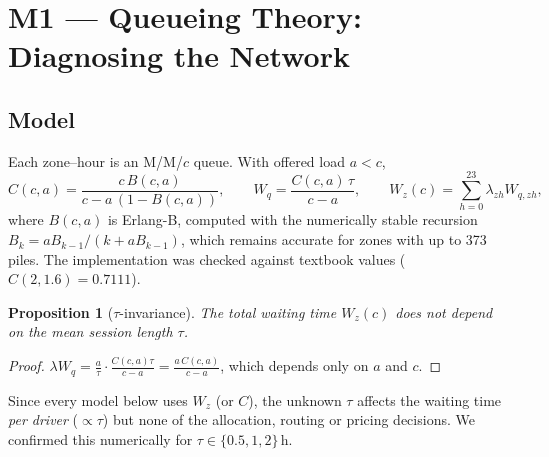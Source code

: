 \documentclass[11pt,a4paper]{article}
\newtheorem{proposition}{Proposition}
\begin{document}
\section{M1 --- Queueing Theory: Diagnosing the Network}\label{sec:m1}
\subsection{Model}
Each zone--hour is an M/M/$c$ queue. With offered load $a < c$,
\[
C(c,a) = \frac{c\,B(c,a)}{c - a\,(1 - B(c,a))},\qquad
W_q = \frac{C(c,a)\,\tau}{c-a},\qquad
W_z(c) = \sum_{h=0}^{23} \lambda_{zh} W_{q,zh},
\]
where $B(c,a)$ is Erlang-B, computed with the numerically stable recursion $B_k = aB_{k-1}/(k + aB_{k-1})$, which remains accurate for zones with up to 373 piles. The implementation was checked against textbook values ($C(2,1.6) = 0.7111$).

\begin{proposition}[$\tau$-invariance]\label{prop:tau}
The total waiting time $W_z(c)$ does not depend on the mean session length $\tau$.
\end{proposition}
\begin{proof}
$\lambda W_q = \frac{a}{\tau}\cdot\frac{C(c,a)\tau}{c-a} = \frac{a\,C(c,a)}{c-a}$, which depends only on $a$ and $c$.
\end{proof}
Since every model below uses $W_z$ (or $C$), the unknown $\tau$ affects the waiting time \emph{per driver} ($\propto\tau$) but none of the allocation, routing or pricing decisions. We confirmed this numerically for $\tau \in \{0.5, 1, 2\}$\,h.
\end{document}
